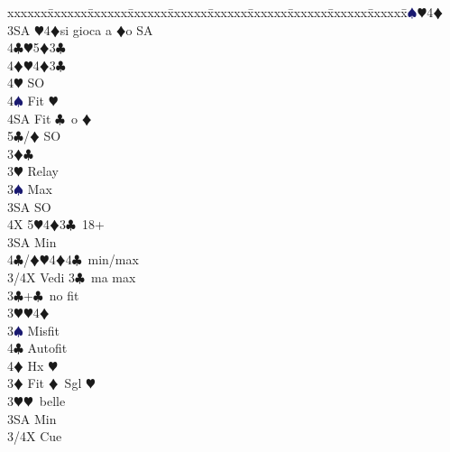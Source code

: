 \documentclass[a4paper,italian]{article}
\newcommand{\BC}{\textcolor{OliveGreen}{$\clubsuit$}}
\newcommand{\BD}{\textcolor{RedOrange}{$\vardiamondsuit$}}
\newcommand{\BH}{\textcolor{Red2}{$\varheartsuit${}}}
\newcommand{\BS}{\textcolor{MidnightBlue}{$\spadesuit${}}}
\newenvironment{bidtable}
{\begin{tabbing}

    xxxxxx\=xxxxxx\=xxxxxx\=xxxxxx\=xxxxxx\=xxxxxx\=xxxxxx\=xxxxxx\=xxxxxx\=xxxxxx\=\kill}
{\end{tabbing} }%
\begin{document}
\begin{multicols}{2}
\begin{bidtable}
                                            3\BS {}\BH 4\BD \\
                                            3SA \BH 4\BD si gioca a \BD o SA\\
                                            4\BC {}\BH 5\BD 3\BC \\
                                            4\BD {}\BH 4\BD 3\BC \+\\
                                            4\BH \> SO\\
                                            4\BS \> Fit \BH \\
                                            4SA \> Fit \BC\ o \BD \\
                                            5\BC/\BD \> SO\-\-\-\\
                                            3\BD {}\BC \+\\
                                            3\BH \> Relay\+\\
                                            3\BS \> Max\+\\
                                            3SA \> SO\+\\
                                            4X 5\BH 4\BD 3\BC\ 18+\-\-\\
                                            3SA \> Min\\
                                            4\BC/\BD {}\BH 4\BD 4\BC\ min/max\-\-\\
                                            3/4X \> Vedi 3\BC\ ma max\-\\
                                            3\BC {}+\BC\ no fit\+\\
                                            3\BH {}\BH 4\BD \+\\
                                            3\BS \> Misfit\\
                                            4\BC \> Autofit\\
                                            4\BD \> Hx \BH \-\-\\
                                            3\BD \> Fit \BD\ Sgl \BH \+\\
                                            3\BH {}\BH\ belle\\
                                            3SA \> Min\\
                                            3/4X \> Cue\-\\

\end{bidtable}
\end{multicols}
\end{document}
